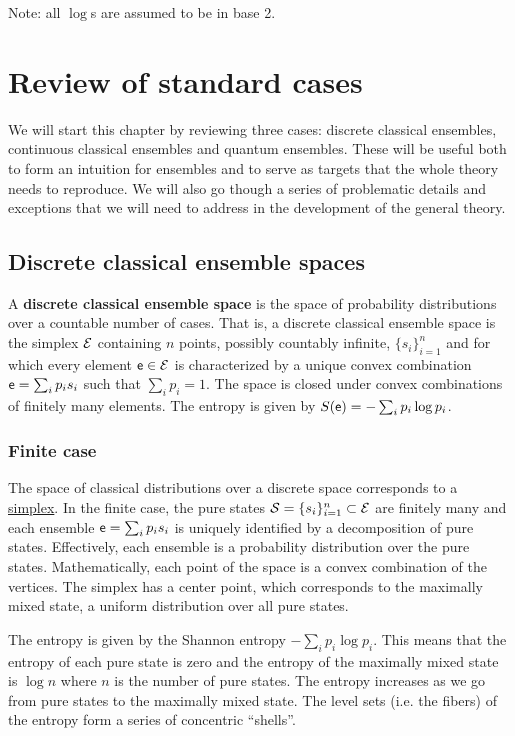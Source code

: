 Note: all $\log$s are assumed to be in base 2.

\section{Review of standard cases}

We will start this chapter by reviewing three cases: discrete classical ensembles, continuous classical ensembles and quantum ensembles. These will be useful both to form an intuition for ensembles and to serve as targets that the whole theory needs to reproduce. We will also go though a series of problematic details and exceptions that we will need to address in the development of the general theory.

\subsection{Discrete classical ensemble spaces}

\begin{defn}
	A \textbf{discrete classical ensemble space} is the space of probability distributions over a countable number of cases. That is, a discrete classical ensemble space is the simplex $\mathcal{E}$ containing $n$ points, possibly countably infinite, $\{s_i\}^n_{i=1}$ and for which every element $\mathsf{e} \in \mathcal{E}$ is characterized by a unique convex combination $\mathsf{e} = \sum_i p_i s_i$ such that $\sum_i p_i = 1$. The space is closed under convex combinations of finitely many elements. The entropy is given by $S(\mathsf{e}) = - \sum_i p_i \log p_i$.
\end{defn}

\subsubsection{Finite case}

The space of classical distributions over a discrete space corresponds to a \href{https://en.wikipedia.org/wiki/Simplex}{simplex}. In the finite case, the pure states $\mathcal{S} = \{s_i\}_{i=1}^{n} \subset \mathcal{E}$ are finitely many and each ensemble $\mathsf{e} = \sum_i p_i s_i$ is uniquely identified by a decomposition of pure states. Effectively, each ensemble is a probability distribution over the pure states. Mathematically, each point of the space is a convex combination of the vertices. The simplex has a center point, which corresponds to the maximally mixed state, a uniform distribution over all pure states. 

The entropy is given by the Shannon entropy $-\sum_i p_i \log p_i$. This means that the entropy of each pure state is zero and the entropy of the maximally mixed state is $\log n$ where $n$ is the number of pure states. The entropy increases as we go from pure states to the maximally mixed state. The level sets (i.e. the fibers) of the entropy form a series of concentric ``shells''.

